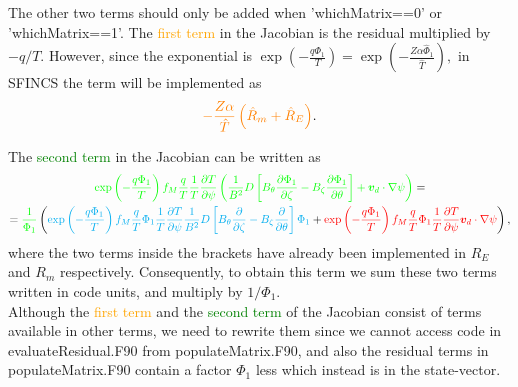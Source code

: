 \documentclass[12pt]{article}
\newcommand{\p}{\partial}
\newcommand{\na}{\nabla}
\begin{document}
\noindent The other two terms should only be added when 'whichMatrix==0' or 'whichMatrix==1'. 
The \textcolor{orange}{first term} in the Jacobian is the residual multiplied by $- q / T$. However, since the exponential is 
$ \displaystyle
\exp \left(- \frac{q \Phi_1}{T}  \right) = \exp \left(- \frac{Z \alpha \hat{\Phi}_1}{\hat{T}}  \right), 
$
in SFINCS the term will be implemented as 
\begin{equation}
  \label{eq:JacobianFirstTerm1}
  \textcolor{orange}{- \frac{Z \alpha}{\hat{T}}  \left(\hat{R}_m + \hat{R}_E\right)}.
\end{equation}

\noindent The \textcolor{green}{second term} in the Jacobian can be written as 
\begin{multline}
  \label{eq:JacobianSecondTerm1}
  \textcolor{green}{
 \exp \left(- \frac{q \Phi_1}{T}  \right) f_{M} \frac{q}{T} \frac{1}{T} \frac{\p T}{\p \psi} \left(\frac{1}{B^2} D \left[B_\theta \frac{\p \Phi_1}{\p \zeta} - B_\zeta \frac{\p \Phi_1}{\p \theta}\right] + \bm{v}_d \cdot \na \psi\right)} = \\ = \textcolor{green}{
\frac{1}{\Phi_1}} \left(
\textcolor{cyan}{
 \exp \left(- \frac{q \Phi_1}{T}  \right) f_{M} \frac{q}{T} \Phi_1 \frac{1}{T} \frac{\p T}{\p \psi} \frac{1}{B^2} D \left[B_\theta \frac{\p }{\p \zeta} - B_\zeta \frac{\p }{\p \theta}\right] \Phi_1}
+
\textcolor{red}{
  \exp \left(- \frac{q \Phi_1}{T}  \right) f_{M} \frac{q}{T} \Phi_1 \frac{1}{T} \frac{\p T}{\p \psi} \bm{v}_d \cdot \na \psi }
\right),
\end{multline}
where the two terms inside the brackets have already been implemented in $R_E$ and $R_m$ respectively. Consequently, to obtain this term we sum these two terms written in code units, and multiply by $1 / \hat{\Phi}_1$.\\
Although the \textcolor{orange}{first term} and the \textcolor{green}{second term} of the Jacobian consist of terms available in other terms, we need to rewrite them since we cannot access code in evaluateResidual.F90 from populateMatrix.F90, and also the residual terms in populateMatrix.F90 contain a factor $\Phi_1$ less which instead is in the state-vector.
\end{document}
